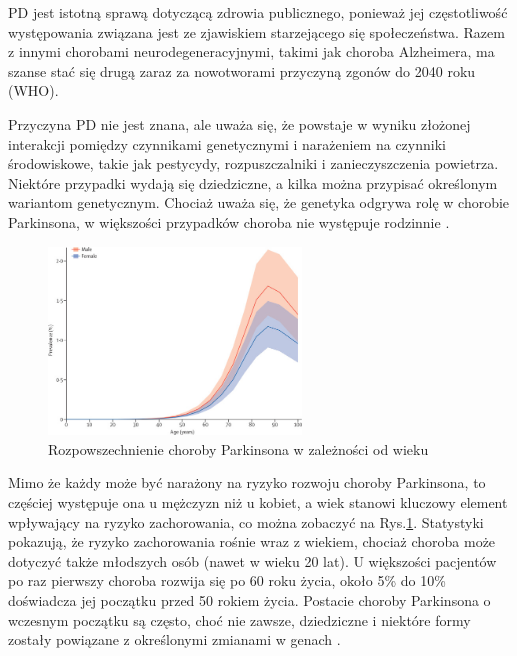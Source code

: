 PD jest istotną sprawą dotyczącą zdrowia publicznego, ponieważ jej częstotliwość występowania związana jest ze zjawiskiem starzejącego się społeczeństwa.
Razem z innymi chorobami neurodegeneracyjnymi, takimi jak choroba Alzheimera, ma szanse stać się drugą zaraz za nowotworami przyczyną zgonów do 2040 roku (WHO).

Przyczyna PD nie jest znana, ale uważa się, że powstaje w wyniku złożonej interakcji pomiędzy czynnikami genetycznymi i
narażeniem na czynniki środowiskowe, takie jak pestycydy, rozpuszczalniki i zanieczyszczenia powietrza.
Niektóre przypadki wydają się dziedziczne, a kilka można przypisać określonym wariantom genetycznym.
Chociaż uważa się, że genetyka odgrywa rolę w chorobie Parkinsona, w większości przypadków choroba nie występuje rodzinnie \cite{National_Institute_on_Aging_2022}.

\begin{figure}[htbp]
	\centering
	\includegraphics[width=0.6\textwidth]{./img/PD_prevalence}
	\caption{Rozpowszechnienie choroby Parkinsona w zależności od wieku \cite{global_PD}}
    \label{fig:PD_prevalance}
\end{figure}

Mimo że każdy może być narażony na ryzyko rozwoju choroby Parkinsona, to częściej występuje ona u mężczyzn niż u kobiet,
a wiek stanowi kluczowy element wpływający na ryzyko zachorowania, co można zobaczyć na Rys.\ref{fig:PD_prevalance}.
Statystyki pokazują, że ryzyko zachorowania rośnie wraz z wiekiem, chociaż choroba może dotyczyć także młodszych osób (nawet w wieku 20 lat).
U większości pacjentów po raz pierwszy choroba rozwija się po 60 roku życia, około 5\% do 10\% doświadcza jej początku przed 50 rokiem życia.
Postacie choroby Parkinsona o wczesnym początku są często, choć nie zawsze, dziedziczne i niektóre formy zostały powiązane z
określonymi zmianami w genach \cite{National_Institute_on_Aging_2022}.


